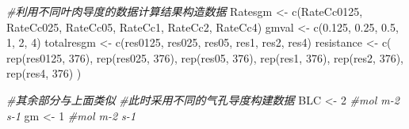 \documentclass[
]{krantz}
\makeatletter
\newenvironment{Shaded}{\begin{snugshade}}{\end{snugshade}}
\newcommand{\CommentTok}[1]{\textcolor[rgb]{0.56,0.35,0.01}{\textit{#1}}}
\newcommand{\DecValTok}[1]{\textcolor[rgb]{0.00,0.00,0.81}{#1}}
\newcommand{\FloatTok}[1]{\textcolor[rgb]{0.00,0.00,0.81}{#1}}
\newcommand{\FunctionTok}[1]{\textcolor[rgb]{0.00,0.00,0.00}{#1}}
\newcommand{\NormalTok}[1]{#1}
\newcommand{\OtherTok}[1]{\textcolor[rgb]{0.56,0.35,0.01}{#1}}
\newenvironment{kframe}{%
\medskip{}
\setlength{\fboxsep}{.8em}
 \def\at@end@of@kframe{}%
 \ifinner\ifhmode%
  \def\at@end@of@kframe{\end{minipage}}%
  \begin{minipage}{\columnwidth}%
 \fi\fi%
 \def\FrameCommand##1{\hskip\@totalleftmargin \hskip-\fboxsep
 \colorbox{shadecolor}{##1}\hskip-\fboxsep
     \hskip-\linewidth \hskip-\@totalleftmargin \hskip\columnwidth}%
 \MakeFramed {\advance\hsize-\width
   \@totalleftmargin\z@ \linewidth\hsize
   \@setminipage}}%
 {\par\unskip\endMakeFramed%
 \at@end@of@kframe}
\renewenvironment{Shaded}{\begin{kframe}}{\end{kframe}}
\makeatother
\begin{document}
\begin{Shaded}
\begin{Highlighting}[]
\CommentTok{\#利用不同叶肉导度的数据计算结果构造数据}
\NormalTok{Ratesgm }\OtherTok{\textless{}{-}}
  \FunctionTok{c}\NormalTok{(RateCc0125, RateCc025, RateCc05, RateCc1, RateCc2, RateCc4)}
\NormalTok{gmval }\OtherTok{\textless{}{-}} \FunctionTok{c}\NormalTok{(}\FloatTok{0.125}\NormalTok{, }\FloatTok{0.25}\NormalTok{, }\FloatTok{0.5}\NormalTok{, }\DecValTok{1}\NormalTok{, }\DecValTok{2}\NormalTok{, }\DecValTok{4}\NormalTok{)}
\NormalTok{totalresgm }\OtherTok{\textless{}{-}} \FunctionTok{c}\NormalTok{(res0125, res025, res05, res1, res2, res4)}
\NormalTok{resistance }\OtherTok{\textless{}{-}}
  \FunctionTok{c}\NormalTok{(}
    \FunctionTok{rep}\NormalTok{(res0125, }\DecValTok{376}\NormalTok{),}
    \FunctionTok{rep}\NormalTok{(res025, }\DecValTok{376}\NormalTok{),}
    \FunctionTok{rep}\NormalTok{(res05, }\DecValTok{376}\NormalTok{),}
    \FunctionTok{rep}\NormalTok{(res1, }\DecValTok{376}\NormalTok{),}
    \FunctionTok{rep}\NormalTok{(res2, }\DecValTok{376}\NormalTok{),}
    \FunctionTok{rep}\NormalTok{(res4, }\DecValTok{376}\NormalTok{)}
\NormalTok{  )}

\CommentTok{\#其余部分与上面类似}
\CommentTok{\#此时采用不同的气孔导度构建数据}
\NormalTok{BLC }\OtherTok{\textless{}{-}} \DecValTok{2} \CommentTok{\#mol m{-}2 s{-}1}
\NormalTok{gm }\OtherTok{\textless{}{-}} \DecValTok{1} \CommentTok{\#mol m{-}2 s{-}1}


\end{Highlighting}
\end{Shaded}
\end{document}

